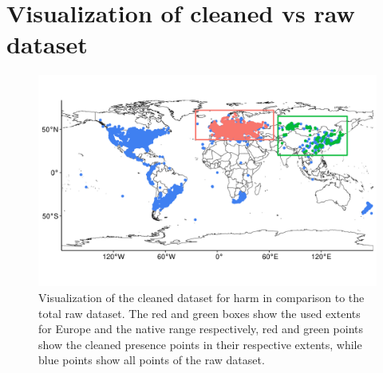 \newpage
\appendix

\section{Visualization of cleaned vs raw dataset}

\begin{figure}[!h]
    \centering
    \includegraphics[width = \linewidth]{"../../R/figures/raw-vs-cleaned-glob.png"}
    \caption{\label{fig:raw_vs_cleaned_glob} Visualization of the cleaned dataset for \gls{harm} in comparison to the total raw dataset. The red and green boxes show the used extents for Europe and the native range respectively, red and green points show the cleaned presence points in their respective extents, while blue points show all points of the raw dataset.}
\end{figure}